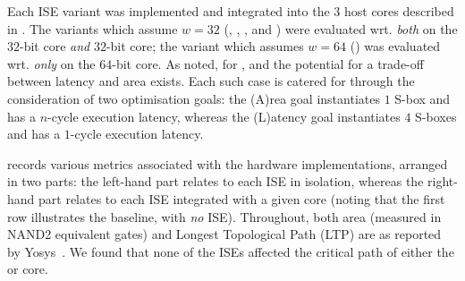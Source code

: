 
Each ISE variant was implemented and integrated into the $3$ host cores 
described in .
The variants which assume  $w = 32$
(, , , and ) 
were evaluated wrt.
{\em both}
on the
$32$-bit  core
{\em  and}
$32$-bit  core;
the variant  which assumes $w = 64$
()
was  evaluated wrt.
{\em only}
on the
$64$-bit  core.
As noted, for ,  and  the potential for a trade-off
between latency and area exists.  Each such case is catered for through
the consideration of two optimisation goals:
the (A)rea    goal
instantiates $1$ S-box   and has a $n$-cycle execution latency,
whereas
the (L)atency goal
instantiates $4$ S-boxes and has a $1$-cycle execution latency.

records
various metrics 
associated with the hardware implementations, 
arranged in two parts: 
the  left-hand part relates to each ISE in isolation,
whereas 
the right-hand part relates to each ISE integrated with a given core
(noting that the first row illustrates the baseline, with {\em no} ISE).
Throughout, both area (measured in NAND2 equivalent gates) and Longest 
Topological Path (LTP) are as reported by Yosys~\cite{yosys}.  We found 
that none of the ISEs affected the critical path of either the  
or  core.

